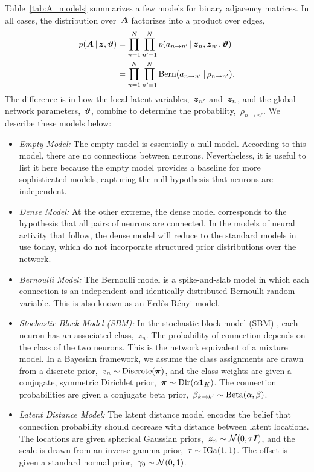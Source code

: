 Table~\ref{tab:A_models} summarizes a few models for binary adjacency
matrices. In all cases, the distribution over~$\boldsymbol{A}$ factorizes into a
product over edges,
\begin{align*}
  p(\boldsymbol{A} \,|\, \boldsymbol{z}, \boldsymbol{\vartheta})
  &= \prod_{n=1}^N \prod_{n'=1}^N p(a_{n \to n'} \,|\, \boldsymbol{z}_n, \boldsymbol{z}_{n'}, \boldsymbol{\vartheta}) \\
  &= \prod_{n=1}^N \prod_{n'=1}^N \mathrm{Bern}(a_{n \to n'} \,|\, \rho_{n \to n'}).
\end{align*}
The difference is in how the local latent variables,~$\boldsymbol{z}_{n'}$
and~$\boldsymbol{z}_n$, and the global network parameters,~$\boldsymbol{\vartheta}$, combine to
determine the probability,~$\rho_{n \to n'}$. We describe these models
below:
\begin{itemize}
\item \textit{Empty Model: } The empty model is essentially a null
  model. According to this model, there are no connections between
  neurons. Nevertheless, it is useful to list it here because
  the empty model provides a baseline for more sophisticated models,
  capturing the null hypothesis that neurons are independent. 
  
\item \textit{Dense Model: } At the other extreme, the dense model
  corresponds to the hypothesis that all pairs of neurons are
  connected. In the models of neural activity that follow, the
  dense model will reduce to the standard models in use today, which
  do not incorporate structured prior distributions over the network.
  
\item \textit{Bernoulli Model: } The Bernoulli model is a
  spike-and-slab model in which each connection is an independent and
  identically distributed Bernoulli random variable. 
  This is also known as an Erd\H{o}s-R\'enyi model.
  
\item \textit{Stochastic Block Model (SBM): } In the stochastic block
  model (SBM) \citep{Nowicki-2001}, each neuron has an associated
  class,~$z_n$.  The probability of connection depends on the class of
  the two neurons.  This is the network equivalent of a mixture model.
  In a Bayesian framework, we assume the class assignments are drawn
  from a discrete prior,~${z_n \sim \mathrm{Discrete}(\boldsymbol{\pi})}$, and
  the class weights are given a conjugate, symmetric Dirichlet
  prior,~${\boldsymbol{\pi} \sim \mathrm{Dir}(\alpha \boldsymbol{1}_K)}$. The connection
  probabilities are given a conjugate beta prior,~${\beta_{k \to k'}
    \sim \mathrm{Beta}(\alpha, \beta)}$.
  
\item \textit{Latent Distance Model: } The latent distance model
  \citep{Hoff-2008} encodes the belief that connection probability
  should decrease with distance between latent locations. The
  locations are given spherical Gaussian priors,~$\boldsymbol{z}_n \sim
  \mathcal{N}(0, \tau \boldsymbol{I})$, and the scale is drawn from an inverse
  gamma prior,~$\tau \sim \mathrm{IGa}(1,1)$. The offset is given a
  standard normal prior,~$\gamma_0 \sim \mathcal{N}(0, 1)$.

\end{itemize}


